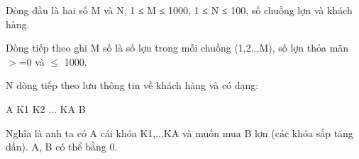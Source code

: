 Dòng đầu là hai số M và N, 1 ≤ M ≤ 1000, 1 ≤ N ≤ 100, số chuồng lợn và khách hàng.  

   Dòng tiếp theo ghi M số là số lợn trong mỗi chuồng (1,2..,M), số lợn thỏa mãn $>$=0 và  $\le$ 1000.  

   N dòng tiếp theo lưu thông tin về khách hàng và có dạng:  

   A K1 K2 ... KA B  

   Nghĩa là anh ta có A cái khóa K1,..,KA và muốn mua B lợn (các khóa sắp  tăng dần). A, B có thể bằng 0.  

\